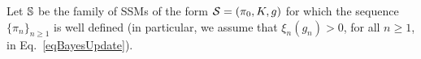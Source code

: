 \documentclass[onefignum,onetabnum]{siamonline250211}%
\begin{document}
Let $\mathbb{S}$ be the family of SSMs of the form ${\mathcal S}=( \pi_0, K, g )$ for which the sequence $\{ \pi_n \}_{n\ge1}$ is well defined (in particular, we assume that $\xi_n(g_n) > 0$, for all $n \ge 1$, in Eq.~\eqref{eqBayesUpdate}).%

%
%
\end{document}
